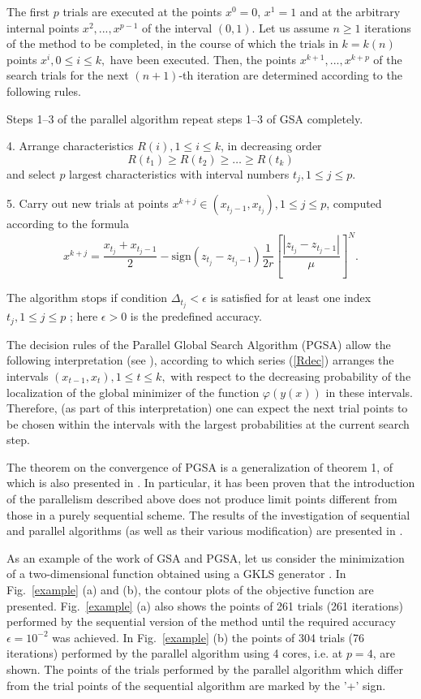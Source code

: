 \documentclass[smallcondensed]{svjour3}     %
\begin{document}
The first $p$ trials are executed at the points $x^0 = 0$, $x^1 = 1$ and at the arbitrary internal points $x^2, ..., x^{p-1}$ of the interval $(0,1)$. Let us assume $n \geq 1$  iterations of the method to be completed, in the course of which the trials in $k=k(n)$ points $x^i, 0 \leq i \leq k,$ have been executed. Then, the points $x^{k+1},...,x^{k+p}$  of the search trials for the next $(n+1)$-th iteration are determined according to the following rules. 

Steps 1--3 of the parallel algorithm repeat steps 1--3 of GSA completely.

4. Arrange characteristics  $R(i), 1 \leq i \leq k$, in decreasing order 
\begin{equation}\label{Rdec}
R(t_1)\geq R(t_2)\geq \dots \geq R(t_{k})
\end{equation}
and select $p$ largest characteristics with interval numbers $t_j, 1\leq j \leq p$.

5. Carry out new trials at points $x^{k+j}\in(x_{t_j-1},x_{t_j}), 1\leq j\leq p$, computed according to the formula
\[
x^{k+j} = \frac{x_{t_j}+x_{t_j-1}}{2} - \mathrm{sign}(z_{t_j}-z_{t_j-1})\frac{1}{2r}\left[\frac{\left|z_{t_j}-z_{t_j-1}\right|}{\mu}\right]^N.
\]

The algorithm stops if condition $\Delta_{t_j}<\epsilon$ is satisfied for at least one index $t_j, 1 \leq j \leq p$ ; here $\epsilon>0$ is the predefined accuracy.

The decision rules of the Parallel Global Search Algorithm (PGSA) allow the following interpretation (see \cite{Strongin2000}), according to which series (\ref{Rdec}) arranges the intervals $(x_{t-1},x_t), 1 \leq t \leq k,$ with respect to the decreasing probability of the localization of the global minimizer of the function $\varphi(y(x))$ in these intervals. Therefore, (as part of this interpretation) one can expect the next trial points to be chosen within the intervals with the largest probabilities at the current search step.

The theorem on the convergence of PGSA is a generalization of theorem 1, of which is also presented in \cite{Strongin2000}. In particular, it has been proven that the introduction of the parallelism described above does not produce limit points different from those in a purely sequential scheme. The results of the investigation of sequential and parallel algorithms (as well as their various modification) are presented in \cite{Sergeyev1994,Grishagin1997}.

As an example of the work of GSA and PGSA, let us consider the minimization of a two-dimensional function obtained using a GKLS generator \cite{Gaviano2003}. In Fig.~\ref{example} (a) and (b), the contour plots of the objective function are presented. Fig.~\ref{example} (a) also shows the points of 261 trials (261 iterations) performed by the sequential version of the method until the required accuracy $\epsilon=10^{-2}$ was achieved. In Fig.~\ref{example} (b) the points of 304 trials (76 iterations) performed by the parallel algorithm using 4 cores, i.e. at $p=4$, are shown. The points of the trials performed by the parallel algorithm which differ from the trial points of the sequential algorithm are marked by the '+' sign.
\end{document}
